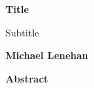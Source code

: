 \thispagestyle{plain}
\begin{center}
    \Large
    \textbf{Title}

    \vspace{0.4cm}
    \large
    Subtitle

    \vspace{0.4cm}
    \textbf{Michael Lenehan}

    \vspace{0.9cm}
    \textbf{Abstract}

\end{center}

\par

\pagebreak
